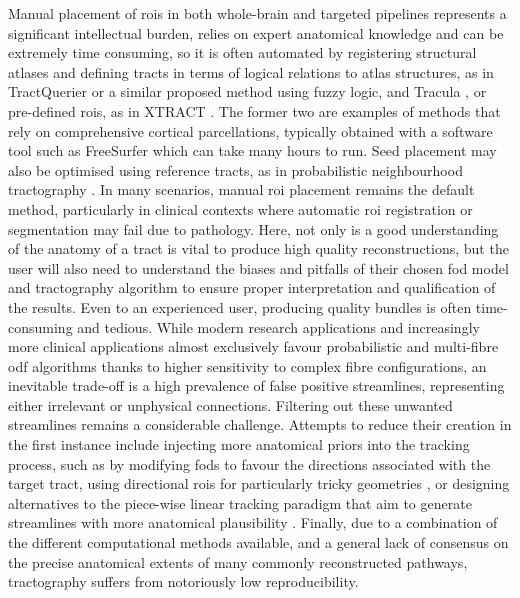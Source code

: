 Manual placement of \glspl{roi} in both whole-brain and targeted pipelines represents a significant intellectual burden, relies on expert anatomical knowledge and can be extremely time consuming, so it is often automated by registering structural atlases and defining tracts in terms of logical relations to atlas structures, as in TractQuerier\autocite{Wassermann2016} or a similar proposed method using fuzzy logic\autocite{Delmonte2019}, and Tracula \autocite{Yendiki2011}, or pre-defined \glspl{roi}, as in XTRACT \autocite{Warrington2020}.
The former two are examples of methods that rely on comprehensive cortical parcellations, typically obtained with a software tool such as FreeSurfer\autocite{Desikan2006,FischlSalat2002} which can take many hours to run.
Seed placement may also be optimised using reference tracts, as in probabilistic neighbourhood tractography \autocite{Clayden2006,Clayden2009}.
In many scenarios, manual \gls{roi} placement remains the default method, particularly in clinical contexts where automatic \gls{roi} registration or segmentation may fail due to pathology.
Here, not only is a good understanding of the anatomy of a tract is vital to produce high quality reconstructions, but the user will also need to understand the biases and pitfalls of their chosen \gls{fod} model and tractography algorithm to ensure proper interpretation and qualification of the results\autocite{Rheault2020,Rheault2022}.
Even to an experienced user, producing quality bundles is often time-consuming and tedious.
While modern research applications and increasingly more clinical applications almost exclusively favour probabilistic and multi-fibre \gls{odf} algorithms thanks to higher sensitivity to complex fibre configurations\autocite{Yang2021}, an inevitable trade-off is a high prevalence of false positive streamlines, representing either irrelevant or unphysical connections.
Filtering out these unwanted streamlines remains a considerable challenge\autocite{Jorgens2021}.
Attempts to reduce their creation in the first instance include injecting more anatomical priors into the tracking process, such as by modifying \glspl{fod} to favour the directions associated with the target tract\autocite{Rheault2019}, using directional \glspl{roi} for particularly tricky geometries \autocite{Chamberland2017}, or designing alternatives to the piece-wise linear tracking paradigm that aim to generate streamlines with more anatomical plausibility \autocite{Schomburg2017,Aydogan2021}.
Finally, due to a combination of the different computational methods available, and a general lack of consensus on the precise anatomical extents of many commonly reconstructed pathways, tractography suffers from notoriously low reproducibility\autocite{Schilling2021a}.


